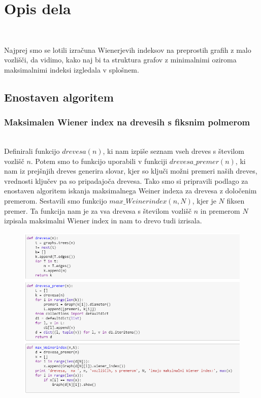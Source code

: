 \documentclass[12pt,a4paper]{amsart}
\theoremstyle{definition} %
\theoremstyle{plain} %
\begin{document}
\section{Opis dela}

\

Najprej smo se lotili izračuna Wienerjevih indeksov na preprostih grafih z malo vozlišči, da vidimo, kako naj bi ta struktura grafov 
z minimalnimi oziroma maksimalnimi indeksi izgledala v splošnem. 
\subsection{Enostaven algoritem}
\subsubsection{Maksimalen Wiener index na drevesih s fiksnim polmerom}
\
\\
Definirali funkcijo $drevesa(n)$, ki nam izpiše seznam vseh dreves s številom vozlišč $n$. Potem smo to funkcijo uporabili v 
funkciji $drevesa\_premer(n)$, ki nam iz prejšnjih dreves generira slovar, kjer so ključi možni premeri naših dreves, vrednosti ključev pa so pripadajoča drevesa. Tako smo si pripravili podlago za enostaven algoritem iskanja maksimalnega Weiner indexa za drevesa z določenim premerom. 
Sestavili smo funkcijo $max\_Weinerindex(n,N)$, kjer je $N$ fiksen premer. Ta funkcija nam je za vsa drevesa s številom vozlišč $n$ in premerom $N$ izpisala maksimalni Wiener index in nam to drevo tudi izrisala.
\begin{figure}[ht]
\centering
\includegraphics[width=1\textwidth]{slika1}
\end{figure}
\pagebreak
\end{document}
